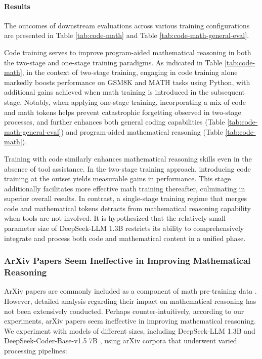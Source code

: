 \begin{itemize}[topsep=0pt]
\begin{itemize}[topsep=0pt]
\paragraph{Results}
The outcomes of downstream evaluations across various training configurations are presented in Table \ref{tab:code-math} and Table \ref{tab:code-math-general-eval}.

Code training serves to improve program-aided mathematical reasoning in both the two-stage and one-stage training paradigms. As indicated in Table \ref{tab:code-math}, in the context of two-stage training, engaging in code training alone markedly boosts performance on GSM8K and MATH tasks using Python, with additional gains achieved when math training is introduced in the subsequent stage. Notably, when applying one-stage training, incorporating a mix of code and math tokens helps prevent catastrophic forgetting observed in two-stage processes, and further enhances both general coding capabilities (Table \ref{tab:code-math-general-eval}) and program-aided mathematical reasoning (Table \ref{tab:code-math}).

Training with code similarly enhances mathematical reasoning skills even in the absence of tool assistance. In the two-stage training approach, introducing code training at the outset yields measurable gains in performance. This stage additionally facilitates more effective math training thereafter, culminating in superior overall results. In contrast, a single-stage training regime that merges code and mathematical tokens detracts from mathematical reasoning capability when tools are not involved. It is hypothesized that the relatively small parameter size of DeepSeek-LLM 1.3B restricts its ability to comprehensively integrate and process both code and mathematical content in a unified phase.

\subsubsection{ArXiv Papers Seem Ineffective in Improving Mathematical Reasoning}

ArXiv papers are commonly included as a component of math pre-training data \citep{minerva,gpt-f,llemma,mathpile}. However, detailed analysis regarding their impact on mathematical reasoning has not been extensively conducted. Perhaps counter-intuitively, according to our experiments, arXiv papers seem ineffective in improving mathematical reasoning. We experiment with models of different sizes, including DeepSeek-LLM 1.3B and DeepSeek-Coder-Base-v1.5 7B \citep{deepseek-coder}, using arXiv corpora that underwent varied processing pipelines:


\end{itemize}
\end{itemize}
